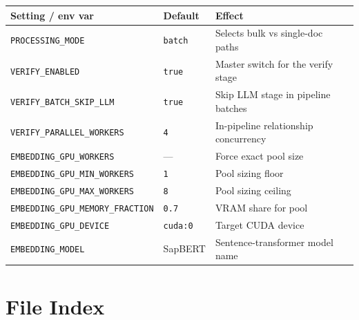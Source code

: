 \documentclass[11pt,a4paper]{article}
\begin{document}
\medskip
\begin{tabular}{@{}lll@{}}
  \toprule
  Setting / env var & Default & Effect \\
  \midrule
  \texttt{PROCESSING\_MODE}         & \texttt{batch}  & Selects bulk vs single-doc paths \\
  \texttt{VERIFY\_ENABLED}          & \texttt{true}   & Master switch for the verify stage \\
  \texttt{VERIFY\_BATCH\_SKIP\_LLM} & \texttt{true}   & Skip LLM stage in pipeline batches \\
  \texttt{VERIFY\_PARALLEL\_WORKERS}& \texttt{4}      & In-pipeline relationship concurrency \\
  \texttt{EMBEDDING\_GPU\_WORKERS}  & ---             & Force exact pool size \\
  \texttt{EMBEDDING\_GPU\_MIN\_WORKERS} & \texttt{1}  & Pool sizing floor \\
  \texttt{EMBEDDING\_GPU\_MAX\_WORKERS} & \texttt{8}  & Pool sizing ceiling \\
  \texttt{EMBEDDING\_GPU\_MEMORY\_FRACTION} & \texttt{0.7} & VRAM share for pool \\
  \texttt{EMBEDDING\_GPU\_DEVICE}   & \texttt{cuda:0} & Target CUDA device \\
  \texttt{EMBEDDING\_MODEL}         & SapBERT         & Sentence-transformer model name \\
  \bottomrule
\end{tabular}

\section{File Index}
\end{document}
